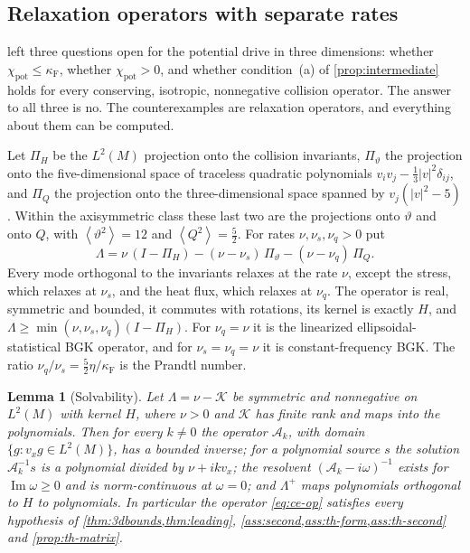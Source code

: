 \documentclass[11pt]{article}
\newcommand{\av}[1]{\left\langle #1\right\rangle}
\newcommand{\A}{\mathcal A}
\newcommand{\F}{\kappa_{\mathrm F}}
\newcommand{\Imag}{\operatorname{Im}}
\newcommand{\pot}{\mathrm{pot}}
\newtheorem{lemma}[theorem]{Lemma}
\theoremstyle{definition}
\theoremstyle{remark}
\numberwithin{equation}{section}
\begin{document}
\subsection{Relaxation operators with separate rates}\label{sec:ce-family}

 left three questions open for the
potential drive in three dimensions: whether $\chi_\pot\leq\F$, whether
$\chi_\pot>0$, and whether condition~(a) of \cref{prop:intermediate}
holds for every conserving, isotropic, nonnegative collision operator.
The answer to all three is no. The counterexamples are relaxation
operators, and everything about them can be computed.

Let $\Pi_H$ be the $L^2(M)$ projection onto the collision invariants,
$\Pi_\vartheta$ the projection onto the five-dimensional space of
traceless quadratic polynomials $v_iv_j-\tfrac13|v|^2\delta_{ij}$, and
$\Pi_Q$ the projection onto the three-dimensional space spanned by
$v_j(|v|^2-5)$. Within the axisymmetric class these last two are the
projections onto $\vartheta$ and onto $Q$, with
$\av{\vartheta^2}=12$ and $\av{Q^2}=\tfrac52$. For rates
$\nu,\nu_s,\nu_q>0$ put
\begin{equation}
 \Lambda=\nu\,(I-\Pi_H)-(\nu-\nu_s)\,\Pi_\vartheta-(\nu-\nu_q)\,\Pi_Q .
 \label{eq:ce-op}
\end{equation}
Every mode orthogonal to the invariants relaxes at the rate $\nu$, except
the stress, which relaxes at $\nu_s$, and the heat flux, which relaxes at
$\nu_q$. The operator is real, symmetric and bounded, it commutes with
rotations, its kernel is exactly $H$, and
$\Lambda\geq\min(\nu,\nu_s,\nu_q)(I-\Pi_H)$. For $\nu_q=\nu$ it is the
linearized ellipsoidal-statistical BGK operator, and for
$\nu_s=\nu_q=\nu$ it is constant-frequency BGK. The ratio
$\nu_q/\nu_s=\tfrac52\eta/\F$ is the Prandtl number.

\begin{lemma}[Solvability]\label{lem:ce-solv}
Let $\Lambda=\nu-\mathcal K$ be symmetric and nonnegative on $L^2(M)$
with kernel $H$, where $\nu>0$ and $\mathcal K$ has finite rank and maps
into the polynomials. Then for every $k\ne0$ the operator $\A_k$, with
domain $\{g:v_xg\in L^2(M)\}$, has a bounded inverse; for a polynomial
source $s$ the solution $\A_k^{-1}s$ is a polynomial divided by
$\nu+ikv_x$; the resolvent $(\A_k-i\omega)^{-1}$ exists for
$\Imag\omega\geq0$ and is norm-continuous at $\omega=0$; and
$\Lambda^+$ maps polynomials orthogonal to $H$ to polynomials. In
particular the operator \eqref{eq:ce-op} satisfies every hypothesis of
\cref{thm:3dbounds,thm:leading}, \cref{ass:second,ass:th-form,ass:th-second}
and \cref{prop:th-matrix}.
\end{lemma}
\end{document}
